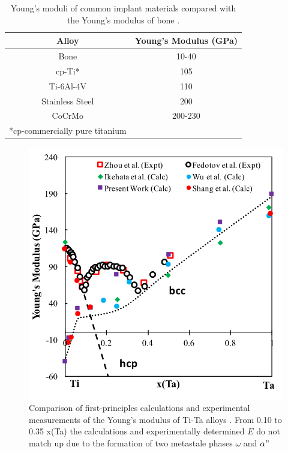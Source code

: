 				
\pagebreak
\begin{table}[H]
	\caption{Young's moduli of common implant materials compared with the Young's modulus of bone \cite{Long1998a}.}
	\centering
	\begin{tabular}{ c c }
		\hline
		Alloy & Young's Modulus (GPa) \\
		\hline
		Bone & 10-40\\
		cp-Ti* & 105\\
		Ti-6Al-4V & 110\\
		Stainless Steel & 200\\
		CoCrMo & 200-230\\
		\hline
		*cp-commercially pure titanium 
	\end{tabular}
\label{table:commonEM}
\end{table}
\clearpage

\newpage
\begin{figure}[H]
	\centering
	\includegraphics{Chapter-1/Figures/TiTaElastic.png}
	\caption{Comparison of first-principles calculations \cite{Wu2010a,Ikehata2004} and experimental measurements of the Young's modulus of Ti-Ta alloys \cite{Zhou2004a,Zhou2009a,Fedotov1985}. From 0.10 to 0.35 x(Ta) the calculations and experimentally determined $E$ do not match up due to the formation of two metastale phases $\omega$ and $\alpha"$}
	\label{Ch1-figure:titaelastic}
\end{figure}


